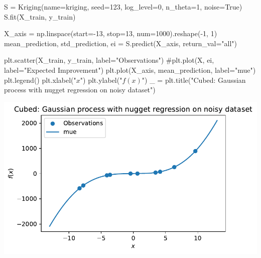 \documentclass[
  letterpaper,
  DIV=11,
  numbers=noendperiod]{scrreprt}
\newenvironment{Shaded}{\begin{snugshade}}{\end{snugshade}}
\newcommand{\CommentTok}[1]{\textcolor[rgb]{0.37,0.37,0.37}{#1}}
\newcommand{\DecValTok}[1]{\textcolor[rgb]{0.68,0.00,0.00}{#1}}
\newcommand{\NormalTok}[1]{\textcolor[rgb]{0.00,0.23,0.31}{#1}}
\newcommand{\OperatorTok}[1]{\textcolor[rgb]{0.37,0.37,0.37}{#1}}
\newcommand{\StringTok}[1]{\textcolor[rgb]{0.13,0.47,0.30}{#1}}
\newcommand{\VariableTok}[1]{\textcolor[rgb]{0.07,0.07,0.07}{#1}}
\begin{document}
\begin{Shaded}
\begin{Highlighting}[]
\NormalTok{S }\OperatorTok{=}\NormalTok{ Kriging(name}\OperatorTok{=}\StringTok{\textquotesingle{}kriging\textquotesingle{}}\NormalTok{,  seed}\OperatorTok{=}\DecValTok{123}\NormalTok{, log\_level}\OperatorTok{=}\DecValTok{0}\NormalTok{, n\_theta}\OperatorTok{=}\DecValTok{1}\NormalTok{, noise}\OperatorTok{=}\VariableTok{True}\NormalTok{)}
\NormalTok{S.fit(X\_train, y\_train)}

\NormalTok{X\_axis }\OperatorTok{=}\NormalTok{ np.linspace(start}\OperatorTok{={-}}\DecValTok{13}\NormalTok{, stop}\OperatorTok{=}\DecValTok{13}\NormalTok{, num}\OperatorTok{=}\DecValTok{1000}\NormalTok{).reshape(}\OperatorTok{{-}}\DecValTok{1}\NormalTok{, }\DecValTok{1}\NormalTok{)}
\NormalTok{mean\_prediction, std\_prediction, ei }\OperatorTok{=}\NormalTok{ S.predict(X\_axis, return\_val}\OperatorTok{=}\StringTok{"all"}\NormalTok{)}

\NormalTok{plt.scatter(X\_train, y\_train, label}\OperatorTok{=}\StringTok{"Observations"}\NormalTok{)}
\CommentTok{\#plt.plot(X, ei, label="Expected Improvement")}
\NormalTok{plt.plot(X\_axis, mean\_prediction, label}\OperatorTok{=}\StringTok{"mue"}\NormalTok{)}
\NormalTok{plt.legend()}
\NormalTok{plt.xlabel(}\StringTok{"$x$"}\NormalTok{)}
\NormalTok{plt.ylabel(}\StringTok{"$f(x)$"}\NormalTok{)}
\NormalTok{\_ }\OperatorTok{=}\NormalTok{ plt.title(}\StringTok{"Cubed: Gaussian process with nugget regression on noisy dataset"}\NormalTok{)}
\end{Highlighting}
\end{Shaded}

\includegraphics{012_num_spot_ei_files/figure-pdf/cell-54-output-1.pdf}
\end{document}
